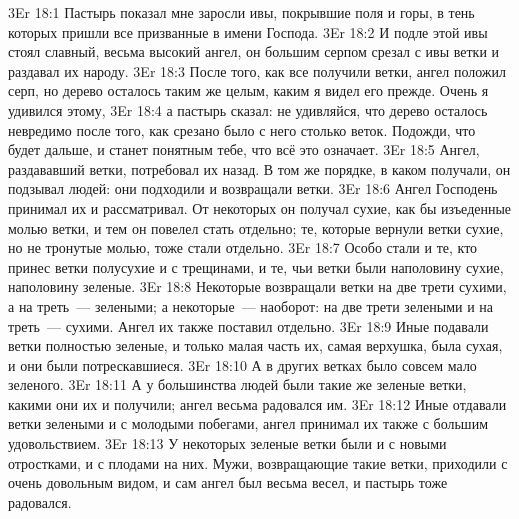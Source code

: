 \vs 3Er 18:1
Пастырь показал мне заросли ивы, покрывшие поля и горы, в
тень которых пришли все призванные в имени Господа.
\vs 3Er 18:2
И подле этой ивы стоял славный, весьма высокий ангел, он большим серпом срезал
с ивы ветки и раздавал их народу.
\vs 3Er 18:3
После того, как все получили ветки, ангел положил серп, но дерево осталось
таким же целым, каким я видел его прежде. Очень я удивился этому,
\vs 3Er 18:4
а пастырь сказал: не удивляйся, что дерево осталось невредимо после того, как
срезано было с него столько веток. Подожди, что будет дальше, и станет
понятным тебе, что всё это означает.
\vs 3Er 18:5
Ангел, раздававший ветки,
потребовал их назад. В том же порядке, в каком получали, он подзывал людей:
они подходили и возвращали ветки.
\vs 3Er 18:6
Ангел Господень принимал
их и рассматривал. От некоторых он получал сухие, как бы изъеденные молью
ветки, и тем он повелел стать отдельно; те, которые вернули ветки сухие, но не
тронутые молью, тоже стали отдельно.
\vs 3Er 18:7
Особо стали и те, кто
принес ветки полусухие и с трещинами, и те, чьи ветки были наполовину сухие,
наполовину зеленые.
\vs 3Er 18:8
Некоторые возвращали ветки
на две трети сухими, а на треть~--- зелеными; а некоторые~--- наоборот: на две
трети зелеными и на треть~--- сухими. Ангел их также поставил отдельно.
\vs 3Er 18:9
Иные подавали ветки
полностью зеленые, и только малая часть их, самая верхушка, была сухая, и они
были потрескавшиеся.
\vs 3Er 18:10
А в других ветках было
совсем мало зеленого.
\vs 3Er 18:11
А у большинства людей
были такие же зеленые ветки, какими они их и получили; ангел весьма радовался
им.
\vs 3Er 18:12
Иные отдавали ветки
зелеными и с молодыми побегами, ангел принимал их также с большим
удовольствием.
\vs 3Er 18:13
У некоторых зеленые ветки
были и с новыми отростками, и с плодами на них. Мужи, возвращающие такие
ветки, приходили с очень довольным видом, и сам ангел был весьма весел, и
пастырь тоже радовался.

